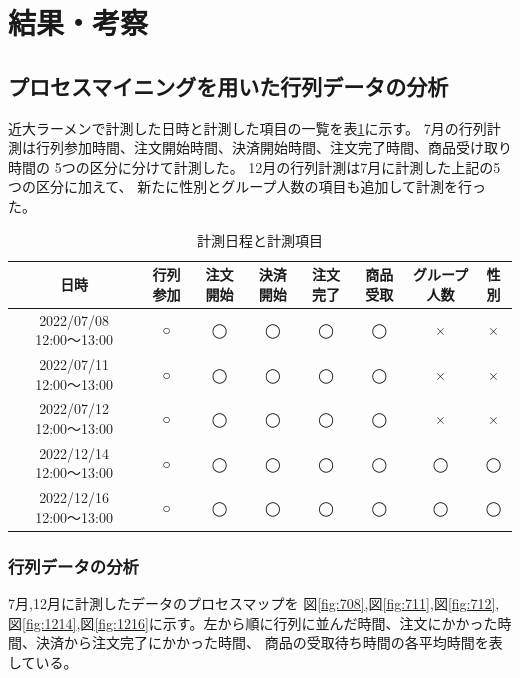 \documentclass{jsarticle}
\begin{document}
\newpage

\section{結果・考察}

\subsection{プロセスマイニングを用いた行列データの分析}

近大ラーメンで計測した日時と計測した項目の一覧を表\ref{table5}に示す。
7月の行列計測は行列参加時間、注文開始時間、決済開始時間、注文完了時間、商品受け取り時間の
5つの区分に分けて計測した。
12月の行列計測は7月に計測した上記の5つの区分に加えて、
新たに性別とグループ人数の項目も追加して計測を行った。

\begin{table}[H]
 \begin{center}
   \caption{計測日程と計測項目}
   \begin{tabular}{|c|c|c|c|c|c|c|c|} \hline
日時 & 行列参加 & 注文開始 & 決済開始 & 注文完了 & 商品受取 & グループ人数 & 性別 \\ \hline \hline
2022/07/08 12:00〜13:00 & ○ & ◯ & ◯ & ◯ & ◯ & × & × \\ \hline
2022/07/11 12:00〜13:00 & ○ & ◯ & ◯ & ◯ & ◯ & × & × \\ \hline
2022/07/12 12:00〜13:00 & ○ & ◯ & ◯ & ◯ & ◯ & × & × \\ \hline
2022/12/14 12:00〜13:00 & ○ & ◯ & ◯ & ◯ & ◯ & ◯ & ◯ \\ \hline
2022/12/16 12:00〜13:00 & ○ & ◯ & ◯ & ◯ & ◯ & ◯ & ◯ \\ \hline
  \end{tabular}
 \label{table5}
 \end{center}
\end{table}




\subsubsection{行列データの分析}
7月,12月に計測したデータのプロセスマップを
図\ref{fig:708},図\ref{fig:711},図\ref{fig:712},図\ref{fig:1214},図\ref{fig:1216}に示す。左から順に行列に並んだ時間、注文にかかった時間、決済から注文完了にかかった時間、
商品の受取待ち時間の各平均時間を表している。
\end{document}
